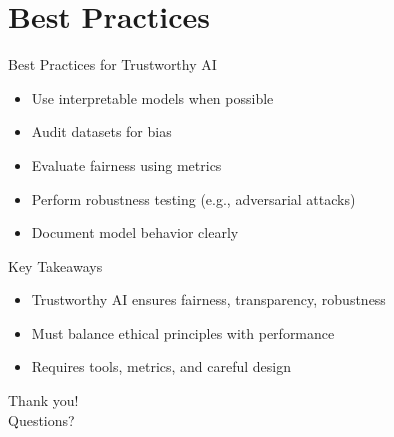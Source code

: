 \documentclass{beamer}
\begin{document}
\section{Best Practices}
\begin{frame}{Best Practices for Trustworthy AI}
\begin{itemize}
    \item Use interpretable models when possible
    \item Audit datasets for bias
    \item Evaluate fairness using metrics
    \item Perform robustness testing (e.g., adversarial attacks)
    \item Document model behavior clearly
\end{itemize}
\end{frame}

\begin{frame}{Key Takeaways}
\begin{itemize}
    \item Trustworthy AI ensures fairness, transparency, robustness
    \item Must balance ethical principles with performance
    \item Requires tools, metrics, and careful design
\end{itemize}
\end{frame}

\begin{frame}[standout]
    Thank you! \\
    Questions?
\end{frame}
\end{document}
